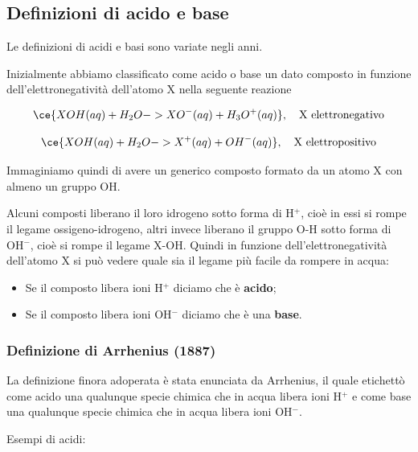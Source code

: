 \normalsize \subsection{Definizioni di acido e base}
Le definizioni di acidi e basi sono variate negli anni.

Inizialmente abbiamo classificato come acido o base un dato composto in funzione dell'elettronegatività dell'atomo X nella seguente reazione

$$\ce{XOH(aq) + H_2O -> XO^-(aq) + H_3O^+(aq)}, \quad \text{X elettronegativo}$$

$$\ce{XOH(aq) + H_2O -> X^+(aq) + OH^-(aq)}, \quad \text{X elettropositivo}$$

Immaginiamo quindi di avere un generico composto formato da un atomo X con almeno un gruppo OH.

Alcuni composti liberano il loro idrogeno sotto forma di H$^+$, cioè in essi si rompe il legame ossigeno-idrogeno, altri invece liberano il gruppo O-H sotto forma di OH$^-$, cioè si rompe il legame X-OH. Quindi in funzione dell'elettronegatività dell'atomo X si può vedere quale sia il legame più facile da rompere in acqua:

\begin{itemize}
    \item Se il composto libera ioni H$^+$ diciamo che è \textbf{acido};
    \item Se il composto libera ioni OH$^-$ diciamo che è una \textbf{base}.
\end{itemize}

\subsubsection{Definizione di Arrhenius (1887)}
La definizione finora adoperata è stata enunciata da Arrhenius, il quale etichettò come acido una qualunque specie chimica che in acqua libera ioni H$^+$ e come base una qualunque specie chimica che in acqua libera ioni OH$^-$.

\vspace{0.2cm}Esempi di acidi:

\vspace{0.2cm}

\vspace{0.2cm}

\vspace{0.2cm}

